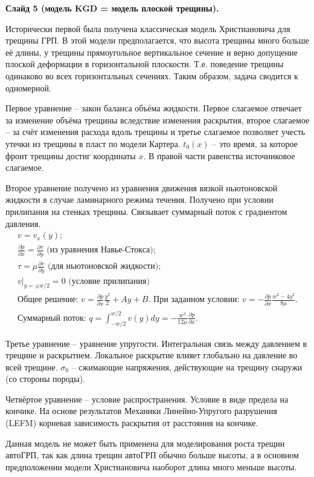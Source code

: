 \documentclass[a4paper, 12pt]{article}
\newcommand{\beq}{\begin{equation}}
\newcommand{\eeq}{\end{equation}}
\begin{document}
\textbf{Слайд 5 (модель KGD = модель плоской трещины).}

Исторически первой была получена классическая модель Христиановича для трещины ГРП.
В этой модели предполагается, что высота трещины много больше её длины, у трещины прямоугольное вертикальное сечение и верно допущение плоской деформации в горизонтальной плоскости.
Т.е. поведение трещины одинаково во всех горизонтальных сечениях.
Таким образом, задача сводится к одномерной.

Первое уравнение -- закон баланса объёма жидкости.
Первое слагаемое отвечает за изменение объёма трещины вследствие изменения раскрытия, второе слагаемое -- за счёт изменения расхода вдоль трещины и третье слагаемое позволяет учесть утечки из трещины в пласт по модели Картера.
$t_0(x)$ -- это время, за которое фронт трещины достиг координаты $x$.
В правой части равенства источниковое слагаемое.

Второе уравнение получено из уравнения движения вязкой ньютоновской жидкости в случае ламинарного режима течения.
Получено при условии прилипания на стенках трещины.
Связывает суммарный поток с градиентом давления.
\beq
\begin{gathered}
v=v_x(y);\\
\frac{\partial p}{\partial x}=\frac{\partial\tau}{\partial y}\text{ (из уравнения Навье-Стокса)};\\
\tau=\mu\frac{\partial v}{\partial y}\text{ (для ньютоновской жидкости)};\\
v|_{y=\pm w/2}=0\text{ (условие прилипания)}\\
\text{Общее решение: }v=\frac{\partial p}{\partial x}\frac{y^2}{2}+Ay+B.\text{ При заданном условии: }v=-\frac{\partial p}{\partial x}\frac{w^2-4y^2}{8\mu}.\\
\text{Суммарный поток: }q=\int_{-w/2}^{w/2}{v(y)}dy=-\frac{w^3}{12\mu}\frac{\partial p}{\partial x}.
\end{gathered}
\eeq


Третье уравнение -- уравнение упругости.
Интегральная связь между давлением в трещине и раскрытием.
Локальное раскрытие влияет глобально на давление во всей трещине.
$\sigma_0$ -- сжимающие напряжения, действующие на трещину снаружи (со стороны породы).

Четвёртое уравнение -- условие распространения.
Условие в виде предела на кончике.
На основе результатов Механики Линейно-Упругого разрушения (LEFM) корневая зависимость раскрытия от расстояния на кончике.

Данная модель не может быть применена для моделирования роста трещин автоГРП, так как длина трещин автоГРП обычно больше высоты, а в основном предположении модели Христиановича наоборот длина много меньше высоты.\\
\end{document}
